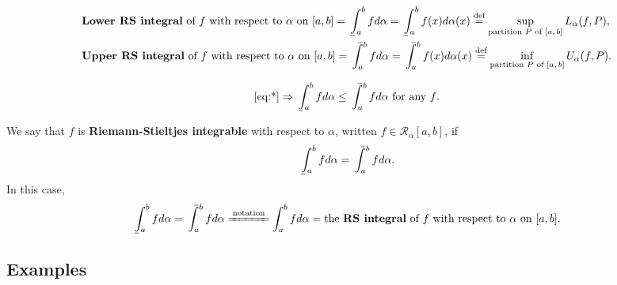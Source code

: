 \documentclass[letterpaper, reqno,11pt]{article}
\def\upint{\mathchoice%
  {\mkern13mu\overline{\vphantom{\intop}\mkern7mu}\mkern-20mu}%
  {\mkern7mu\overline{\vphantom{\intop}\mkern7mu}\mkern-14mu}%
  {\mkern7mu\overline{\vphantom{\intop}\mkern7mu}\mkern-14mu}%
  {\mkern7mu\overline{\vphantom{\intop}\mkern7mu}\mkern-14mu}%
  \int}
\def\lowint{\mkern3mu\underline{\vphantom{\intop}\mkern7mu}\mkern-10mu\int}
\begin{document}
\begin{defn}
  \normalfont
  \begin{align*}
    & \text{{\bf Lower RS integral} of $f$ with respect to $\alpha$ on $[a, b]$} = \lowint_a^b fd\alpha = \lowint_a^b f(x) d\alpha(x) \overset{\text{def}}{=} \sup_\text{partition $P$ of $[a, b]$} L_\alpha(f, P), \\
    & \text{{\bf Upper RS integral} of $f$ with respect to $\alpha$ on $[a, b]$} = \upint_a^b fd\alpha = \upint_a^b f(x) d\alpha(x) \overset{\text{def}}{=} \inf_\text{partition $P$ of $[a, b]$} U_\alpha(f, P).
  \end{align*}
\end{defn}

\begin{remark}
  \normalfont $$ \eqref{eq:*} \Rightarrow \lowint_a^b fd\alpha \leq \upint_a^b fd\alpha \text{ for any $f$}. $$
\end{remark}

\begin{defn}
  \normalfont We say that $f$ is {\bf Riemann-Stieltjes integrable} with respect to $\alpha$, written $f \in \mathcal R_\alpha[a, b]$, if
  $$ \lowint_a^b fd\alpha = \upint_a^b fd\alpha. $$
  In this case,
  $$ \lowint_a^b fd\alpha = \upint_a^b fd\alpha \xlongequal{\text{notation}} \int_a^b fd\alpha = \text{the {\bf RS integral} of $f$ with respect to $\alpha$ on $[a, b]$}. $$
\end{defn}

\subsection{Examples}
\end{document}
